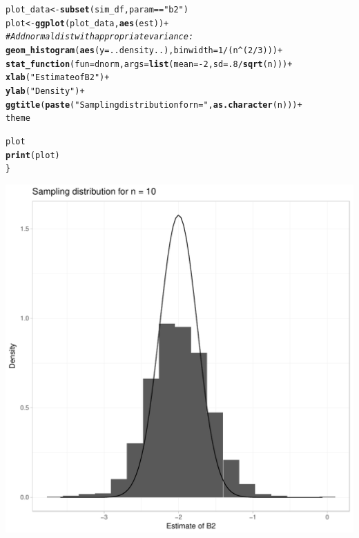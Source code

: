 \documentclass[english, 11pt]{article}\usepackage[]{graphicx}\usepackage[]{color}
\makeatletter
\def\maxwidth{ %
  \ifdim\Gin@nat@width>\linewidth
    \linewidth
  \else
    \Gin@nat@width
  \fi
}
\newcommand{\hlnum}[1]{\textcolor[rgb]{0.686,0.059,0.569}{#1}}%
\newcommand{\hlstr}[1]{\textcolor[rgb]{0.192,0.494,0.8}{#1}}%
\newcommand{\hlcom}[1]{\textcolor[rgb]{0.678,0.584,0.686}{\textit{#1}}}%
\newcommand{\hlopt}[1]{\textcolor[rgb]{0,0,0}{#1}}%
\newcommand{\hlstd}[1]{\textcolor[rgb]{0.345,0.345,0.345}{#1}}%
\newcommand{\hlkwb}[1]{\textcolor[rgb]{0.69,0.353,0.396}{#1}}%
\newcommand{\hlkwc}[1]{\textcolor[rgb]{0.333,0.667,0.333}{#1}}%
\newcommand{\hlkwd}[1]{\textcolor[rgb]{0.737,0.353,0.396}{\textbf{#1}}}%
\newenvironment{kframe}{%
 \def\at@end@of@kframe{}%
 \ifinner\ifhmode%
  \def\at@end@of@kframe{\end{minipage}}%
  \begin{minipage}{\columnwidth}%
 \fi\fi%
 \def\FrameCommand##1{\hskip\@totalleftmargin \hskip-\fboxsep
 \colorbox{shadecolor}{##1}\hskip-\fboxsep
     \hskip-\linewidth \hskip-\@totalleftmargin \hskip\columnwidth}%
 \MakeFramed {\advance\hsize-\width
   \@totalleftmargin\z@ \linewidth\hsize
   \@setminipage}}%
 {\par\unskip\endMakeFramed%
 \at@end@of@kframe}
\newenvironment{knitrout}{}{} %
\makeatother
\begin{document}
\begin{knitrout}
\begin{kframe}
\begin{alltt}
  \hlstd{plot_data}\hlkwb{<-}\hlkwd{subset}\hlstd{(sim_df,  param} \hlopt{==} \hlstr{"b2"}\hlstd{)}
  \hlstd{plot}\hlkwb{<-}\hlkwd{ggplot}\hlstd{(plot_data,} \hlkwd{aes}\hlstd{(est))} \hlopt{+}
    \hlcom{# Add normal dist with appropriate variance:}
    \hlkwd{geom_histogram}\hlstd{(}\hlkwd{aes}\hlstd{(}\hlkwc{y} \hlstd{= ..density..),} \hlkwc{binwidth} \hlstd{=} \hlnum{1}\hlopt{/}\hlstd{(n}\hlopt{^}\hlstd{(}\hlnum{2}\hlopt{/}\hlnum{3}\hlstd{)))} \hlopt{+}
    \hlkwd{stat_function}\hlstd{(}\hlkwc{fun} \hlstd{= dnorm,} \hlkwc{args} \hlstd{=} \hlkwd{list}\hlstd{(}\hlkwc{mean} \hlstd{=} \hlopt{-}\hlnum{2}\hlstd{,} \hlkwc{sd} \hlstd{=} \hlnum{.8}\hlopt{/}\hlkwd{sqrt}\hlstd{(n)))} \hlopt{+}
    \hlkwd{xlab}\hlstd{(}\hlstr{"Estimate of B2"}\hlstd{)} \hlopt{+}
    \hlkwd{ylab}\hlstd{(}\hlstr{"Density"}\hlstd{)} \hlopt{+}
    \hlkwd{ggtitle}\hlstd{(}\hlkwd{paste}\hlstd{(}\hlstr{"Sampling distribution for n ="}\hlstd{,} \hlkwd{as.character}\hlstd{(n)))}\hlopt{+}
    \hlstd{theme}

  \hlstd{plot}
  \hlkwd{print}\hlstd{(plot)}
\hlstd{\}}
\end{alltt}
\end{kframe}
\includegraphics[width=\maxwidth]{figure/Part_B-1} 


\end{knitrout}
\end{document}
